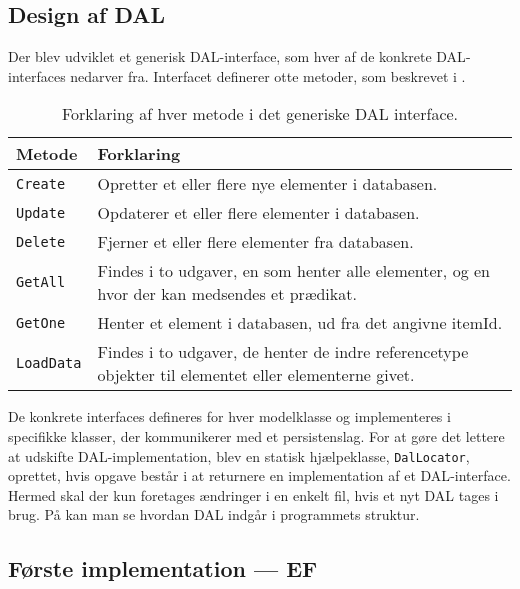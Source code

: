 \subsection{Design af \ac{DAL}}

Der blev udviklet et generisk \ac{DAL}-interface, som hver af de konkrete \ac{DAL}-interfaces nedarver fra.
Interfacet definerer otte metoder, som beskrevet i .

\begin{table}[h]
    \begin{tabular}{p{2cm}|p{13cm}}
    \textbf{Metode}   & \textbf{Forklaring}       \\ \hline
    \texttt{Create}   & Opretter et eller flere nye elementer i databasen.                                           \\ \hline
    \texttt{Update}   & Opdaterer et eller flere elementer i databasen.                                              \\ \hline
    \texttt{Delete}   & Fjerner et eller flere elementer fra databasen.                                              \\ \hline
    \texttt{GetAll}   & Findes i to udgaver, en som henter alle elementer, og en hvor der kan medsendes et prædikat. \\ \hline
    \texttt{GetOne}   & Henter et element i databasen, ud fra det angivne itemId.                                    \\ \hline
    \texttt{LoadData} & Findes i to udgaver, de henter de indre referencetype objekter til elementet eller elementerne givet. \\ \hline
    \end{tabular}
    \caption{Forklaring af hver metode i det generiske DAL interface.}
    \label{tab:ourExtCrud}
\end{table}

De konkrete interfaces defineres for hver modelklasse og implementeres i specifikke klasser, der kommunikerer med et persistenslag.
For at gøre det lettere at udskifte \ac{DAL}-implementation, blev en statisk hjælpeklasse, \texttt{DalLocator}, oprettet, hvis opgave består i at returnere en implementation af et \ac{DAL}-interface. Hermed skal der kun foretages ændringer i en enkelt fil, hvis et nyt DAL tages i brug.
På  kan man se hvordan \ac{DAL} indgår i programmets struktur.

\subsection{Første implementation --- \acl{EF}}\label{subsec:Pwoblem}

